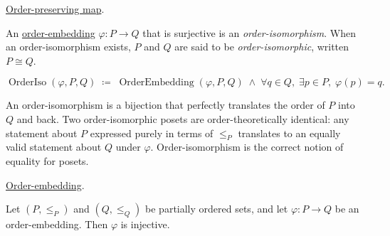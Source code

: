 \begin{remark*}[Dependencies]
\hyperref[def:order-preserving-map]{Order-preserving map}.
\end{remark*}


\begin{tcolorbox}[colback=defbox, colframe=defborder, arc=2pt,
  left=6pt, right=6pt, top=4pt, bottom=4pt,
  title={\small\textbf{Definition (Order-Isomorphism)}},
  fonttitle=\small\bfseries]
\begin{definition}
\label{def:order-isomorphism}
An \hyperref[def:order-embedding]{order-embedding} $\varphi : P \to Q$
that is surjective is an \emph{order-isomorphism}.  When an
order-isomorphism exists, $P$ and $Q$ are said to be
\emph{order-isomorphic}, written $P \cong Q$.
\end{definition}
\end{tcolorbox}

\begin{remark*}
\[
\operatorname{OrderIso}(\varphi, P, Q)
\;\coloneqq\;
\operatorname{OrderEmbedding}(\varphi, P, Q)
\;\land\;
\forall q \in Q,\; \exists p \in P,\; \varphi(p) = q.
\]
\end{remark*}

\begin{remark*}[Interpretation]
An order-isomorphism is a bijection that perfectly translates the order
of $P$ into $Q$ and back.  Two order-isomorphic posets are
order-theoretically identical: any statement about $P$ expressed purely
in terms of $\leq_P$ translates to an equally valid statement about $Q$
under $\varphi$.  Order-isomorphism is the correct notion of equality
for posets.
\end{remark*}

\begin{remark*}[Dependencies]
\hyperref[def:order-embedding]{Order-embedding}.
\end{remark*}


\begin{lemma}
\label{lem:order-embedding-injective}
Let $(P, \leq_P)$ and $(Q, \leq_Q)$ be partially ordered sets, and let
$\varphi : P \to Q$ be an order-embedding.  Then $\varphi$ is injective.
\end{lemma}

